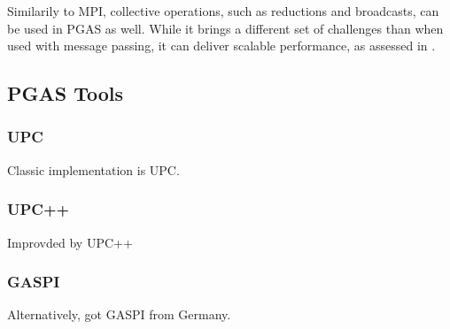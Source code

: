 
Similarily to MPI, collective operations, such as reductions and broadcasts, can be used in PGAS as well. While it brings a different set of challenges than when used with message passing, it can deliver scalable performance, as assessed in \cite{PGAS_CollectiveOpsTuning}. 

\subsection{PGAS Tools}

\subsubsection{UPC}
Classic implementation is UPC.



\subsubsection{UPC++}
Improvded by UPC++
 

\subsubsection{GASPI}
\label{SS:GASPI}

Alternatively, got GASPI from Germany.

